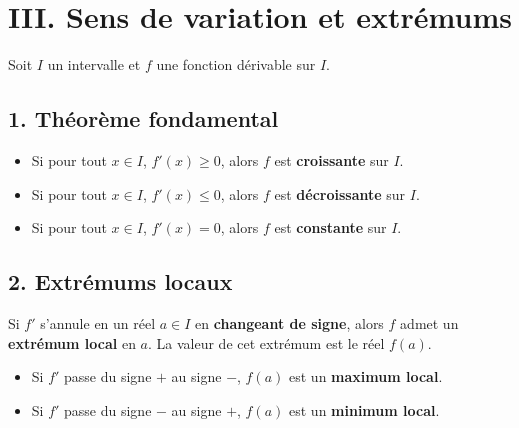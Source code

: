 \documentclass[12pt,a4paper]{article}
\begin{document}

\section*{\color{myred}III. Sens de variation et extrémums}

Soit $I$ un intervalle et $f$ une fonction dérivable sur $I$.

\subsection*{\color{myred}1. Théorème fondamental}
\begin{itemize}
    \item Si pour tout $x \in I$, $f'(x) \geq 0$, alors $f$ est \textbf{croissante} sur $I$.
    \item Si pour tout $x \in I$, $f'(x) \leq 0$, alors $f$ est \textbf{décroissante} sur $I$.
    \item Si pour tout $x \in I$, $f'(x) = 0$, alors $f$ est \textbf{constante} sur $I$.
\end{itemize}

\subsection*{\color{myred}2. Extrémums locaux}
Si $f'$ s'annule en un réel $a \in I$ en \textbf{changeant de signe}, alors $f$ admet un \textbf{extrémum local} en $a$. La valeur de cet extrémum est le réel $f(a)$.

\begin{itemize}
    \item Si $f'$ passe du signe $+$ au signe $-$, $f(a)$ est un \textbf{maximum local}.
    \item Si $f'$ passe du signe $-$ au signe $+$, $f(a)$ est un \textbf{minimum local}.
\end{itemize}
\end{document}
